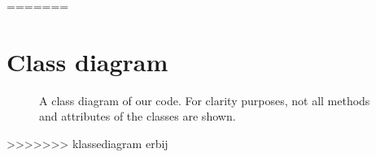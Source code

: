 \documentclass{article}
\begin{document}
=======
\clearpage
\section{Class diagram}\label{app:classDiagram}
\begin{figure}[htb]
        \caption{\label{pic:classDiagram} A class diagram of our code. For clarity purposes, not all methods and attributes of the classes are shown.}
\end{figure}
>>>>>>> klassediagram erbij
\end{document}
